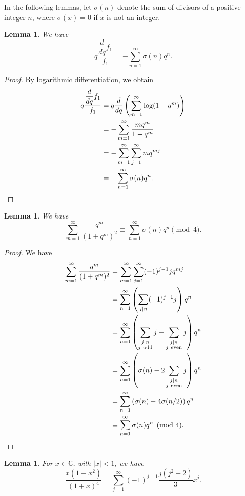 \documentclass[12pt]{article}
\numberwithin{equation}{section}
\newtheorem{lemma}[theorem]{Lemma}
\theoremstyle{definition}
\theoremstyle{remark}
\numberwithin{equation}{section}
\begin{document}
In the following lemmas, let  $\sigma(n)$ denote the sum of divisors of a positive integer  $n$, where $\sigma(x)=0$ if $x$ is not an integer.
\begin{lemma}We have
    \begin{equation}\label{DSMN3}
        q\dfrac{\dfrac{d}{dq} f_1}{f_1}=
-\sum_{n=1}^{\infty}\sigma(n)q^n.
    \end{equation}
\end{lemma}
\begin{proof}
By logarithmic differentiation, we obtain
\begin{align}
 q\dfrac{\dfrac{d}{dq} f_1}{f_1}
&=
q\dfrac{d}{dq}
\left(
\sum_{m=1}^{\infty}\log(1-q^m)
\right)
\notag\\
&\label{SMNE2}=
-\sum_{m=1}^{\infty}
\dfrac{mq^m}{1-q^m}
\\
&=
-\sum_{m=1}^{\infty}
\sum_{j=1}^{\infty}m q^{mj}
\notag\\
&=
-\sum_{n=1}^{\infty}\sigma(n)q^n.\notag
\end{align}
\end{proof}
\begin{lemma} We have
\begin{equation}\label{DSE13}
    \sum_{m=1}^{\infty}
\dfrac{q^m}{(1+q^m)^2}\equiv\sum_{n=1}^{\infty}\sigma(n)q^n\pmod4.
\end{equation}
\end{lemma}
\begin{proof}We have
\begin{align}
\sum_{m=1}^{\infty}
\dfrac{q^m}{(1+q^m)^2}
&=
\sum_{m=1}^{\infty}
\sum_{j=1}^{\infty}
(-1)^{j-1}j q^{mj}
\notag\\
&=
\sum_{n=1}^{\infty}
\left(
\sum_{j\mid n}(-1)^{j-1}j
\right)q^n
\notag\\
&=
\sum_{n=1}^{\infty}
\left(
\sum_{\substack{j\mid n\\j\ {\rm odd}}}j
-
\sum_{\substack{j\mid n\\j\ {\rm even}}}j
\right)q^n
\notag\\
&=
\sum_{n=1}^{\infty}
\left(
\sigma(n)
-
2\sum_{\substack{j\mid n\\j\ {\rm even}}}j
\right)q^n
\notag\\
&\label{SMN1}=
\sum_{n=1}^{\infty}
\left(
\sigma(n)-4\sigma(n/2)
\right)q^n\\
&\equiv
\sum_{n=1}^{\infty}\sigma(n)q^n
\pmod4.\notag
\end{align}
\end{proof}
\begin{lemma}
    For $x\in\mathbb{C}$, with $|x|<1$, we have
    \begin{equation}\label{DSM8M17}
\dfrac{x(1+x^2)}{(1+x)^4}
=
\sum_{j=1}^{\infty}
(-1)^{j-1}
\dfrac{j(j^2+2)}{3}x^j.
    \end{equation}
\end{lemma}
\end{document}
